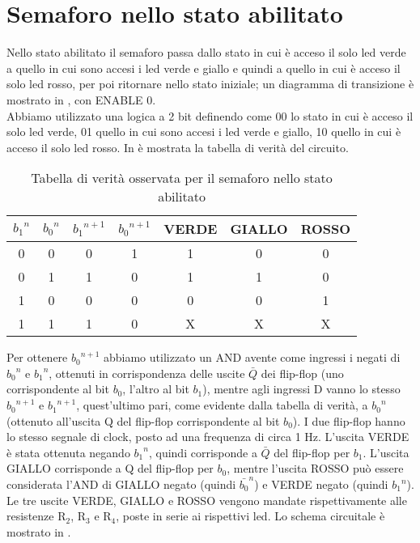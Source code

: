\section{Semaforo nello stato abilitato}
Nello stato abilitato il semaforo passa dallo stato in cui è acceso il solo led verde a quello in cui sono accesi i led verde e giallo e quindi a quello in cui è acceso il solo led rosso, per poi ritornare nello stato iniziale; un diagramma di transizione è mostrato in , con ENABLE 0.\\
Abbiamo utilizzato una logica a 2 bit definendo come 00 lo stato in cui è acceso il solo led verde, 01 quello in cui sono accesi i led verde e giallo, 10 quello in cui è acceso il solo led rosso. In  è mostrata la tabella di verità del circuito.\\
\begin{table}[h]
	\centering
	\begin{tabular}{*{7}{S[table-figures-exponent = 2]}}
		{${b_1}^{n}$} & {${b_0}^{n}$} & {${b_1}^{n+1}$} & {${b_0}^{n+1}$} & {VERDE} & {GIALLO} & {ROSSO} \\
		 & 0 & 0 & 1 & 1 & 0 & 0\\
           0 & 1 & 1 & 0 & 1 & 1 & 0\\
           1 & 0 & 0 & 0 & 0 & 0 & 1\\
           1 & 1 & 1 & 0 & X & X & X\\
 	\end{tabular}
	\caption{ Tabella di verità osservata per il semaforo nello stato abilitato}
	\label{t:Tabella-verità}
\end{table}
Per ottenere ${b_0}^{n+1}$ abbiamo utilizzato un AND avente come ingressi i negati di ${b_0}^{n}$ e ${b_1}^{n}$, ottenuti in corrispondenza delle uscite $\bar  Q$ dei flip-flop (uno corrispondente al bit $b_0$, l'altro al bit $b_1$), mentre agli ingressi D vanno lo stesso ${b_0}^{n+1}$ e ${b_1}^{n+1}$, quest'ultimo pari, come evidente dalla tabella di verità, a ${b_0}^{n}$ (ottenuto all'uscita Q del flip-flop corrispondente al bit $b_0$). I due flip-flop hanno lo stesso segnale di clock, posto ad una frequenza di circa 1 Hz. L'uscita VERDE è stata ottenuta negando ${b_1}^{n}$, quindi corrisponde a $\bar Q$ del flip-flop per $b_1$. L'uscita GIALLO corrisponde a Q del flip-flop per $b_0$, mentre l'uscita ROSSO può essere considerata l'AND di GIALLO negato (quindi ${\bar{b_0}^{n}}$) e VERDE negato (quindi ${b_1}^{n}$). Le tre uscite VERDE, GIALLO e ROSSO vengono mandate rispettivamente alle resistenze R$_2$, R$_3$ e R$_4$, poste in serie ai rispettivi led. Lo schema circuitale è mostrato in .\\
